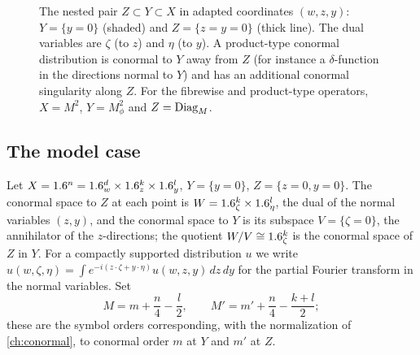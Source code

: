 \begin{figure}[ht]
\centering
{}
\caption{The nested pair $Z\subset Y\subset X$ in adapted coordinates
$(w,z,y)$: $Y=\{y=0\}$ (shaded) and $Z=\{z=y=0\}$ (thick line). The dual
variables are $\zeta$ (to $z$) and $\eta$ (to $y$). A product-type conormal
distribution is conormal to $Y$ away from $Z$ (for instance a $\delta$-function in
the directions normal to $Y$) and has an additional conormal singularity along $Z$.
For the fibrewise and product-type operators, $X=M^2$, $Y=M^2_\phi$ and
$Z=\operatorname{Diag}_M$.}
\label{product:fig:nested}
\end{figure}

\subsection{The model case}
Let $X=1.6^n=1.6^d_w\times1.6^k_z\times1.6^l_y$, $Y=\{y=0\}$, $Z=\{z=0,y=0\}$. The
conormal space to $Z$ at each point is $W=1.6^k_\zeta\times1.6^l_\eta$, the dual
of the normal variables $(z,y)$, and the conormal space to $Y$ is its subspace
$V=\{\zeta=0\}$, the annihilator of the $z$-directions; the quotient $W/V\cong
1.6^k_\zeta$ is the conormal space of $Z$ in $Y$. For a compactly supported
distribution $u$ we write
$\hat u(w,\zeta,\eta)=\int e^{-i(z\cdot\zeta+y\cdot\eta)}u(w,z,y)\,dz\,dy$ for the
partial Fourier transform in the normal variables. Set
\begin{equation}\label{product:eq:orders}
M=m+\frac n4-\frac l2,\qquad M'=m'+\frac n4-\frac{k+l}2;
\end{equation}
these are the symbol orders corresponding, with the normalization of
\cref{ch:conormal}, to conormal order $m$ at $Y$ and $m'$ at $Z$.

